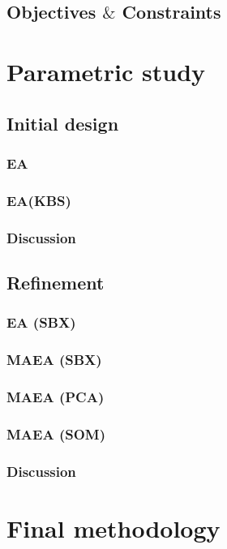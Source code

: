    


\subsection{Objectives $\&$ Constraints}


\section{Parametric study}
\subsection{Initial design}
\subsubsection{EA}
\subsubsection{EA(KBS)}
\subsubsection{Discussion}
\subsection{Refinement}
\subsubsection{EA (SBX)}
\subsubsection{MAEA (SBX)}
\subsubsection{MAEA (PCA)}
\subsubsection{MAEA (SOM)}
\subsubsection{Discussion}
\section{Final methodology}
